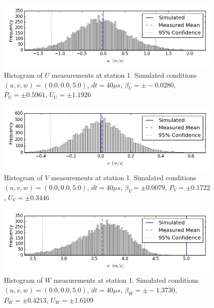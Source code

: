 \begin{figure}[H]
\centering
\includegraphics[width=6in]{figs/Ely_May28th01001/uncertainty_Ely_May28th01001_U}
\caption{Histogram of $U$ measurements at station 1. Simulated conditions $(u,v,w)=(0.0, 0.0, 5.0)$, $dt=40 \mu s$, $\beta_U=\pm -0.0280$, $P_U=\pm 0.5961$, $U_U=\pm 1.1926$}
\label{fig:uncertainty_Ely_May28th01001_U}
\end{figure}


\begin{figure}[H]
\centering
\includegraphics[width=6in]{figs/Ely_May28th01001/uncertainty_Ely_May28th01001_V}
\caption{Histogram of $V$ measurements at station 1. Simulated conditions $(u,v,w)=(0.0, 0.0, 5.0)$, $dt=40 \mu s$, $\beta_V=\pm 0.0079$, $P_V=\pm 0.1722$, $U_V=\pm 0.3446$}
\label{fig:uncertainty_Ely_May28th01001_V}
\end{figure}


\begin{figure}[H]
\centering
\includegraphics[width=6in]{figs/Ely_May28th01001/uncertainty_Ely_May28th01001_W}
\caption{Histogram of $W$ measurements at station 1. Simulated conditions $(u,v,w)=(0.0, 0.0, 5.0)$, $dt=40 \mu s$, $\beta_W=\pm -1.3730$, $P_W=\pm 0.4213$, $U_W=\pm 1.6109$}
\label{fig:uncertainty_Ely_May28th01001_W}
\end{figure}


